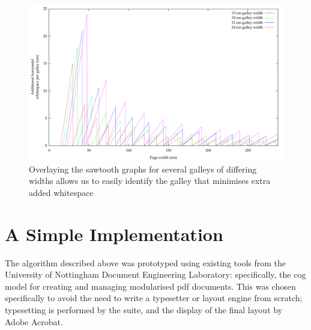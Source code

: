 \begin{figure}
 \includegraphics[height=\textwidth,angle=90]{gnuplot/overlay}
 \caption[Extra whitespace in a multi-galley document]{Overlaying the sawtooth graphs for several galleys of differing widths allows us to easily identify the galley that minimises extra added whitespace}
 \label{fig:overlay}
\end{figure}

\section{A Simple Implementation}
The algorithm described above was prototyped using existing tools from the University of Nottingham Document Engineering Laboratory: specifically, the \gls{cog} model \cite{Bagley2003} for creating and managing modularised \gls{pdf} documents. This was chosen specifically to avoid the need to write a typesetter or layout engine from scratch; typesetting is performed by the \troff{} suite, and the display of the final layout by Adobe Acrobat.  %

